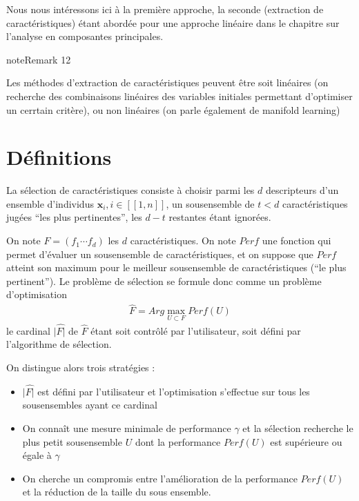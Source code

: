 \documentclass[letterpaper,10pt,english]{jupyterBook}
\begin{document}
\sphinxAtStartPar
Nous nous intéressons ici à la première approche, la seconde (extraction de caractéristiques) étant abordée pour une approche linéaire dans le chapitre sur l’analyse en composantes principales.
\label{selection:remark-0}
\begin{sphinxadmonition}{note}{Remark 12}



\sphinxAtStartPar
Les méthodes d’extraction de caractéristiques peuvent être soit linéaires (on recherche des combinaisons linéaires des variables initiales  permettant d’optimiser un cerrtain critère), ou non linéaires (on parle également de manifold learning)
\end{sphinxadmonition}


\section{Définitions}
\label{\detokenize{selection:definitions}}
\sphinxAtStartPar
La sélection de caractéristiques consiste à choisir parmi les \(d\) descripteurs d’un ensemble d’individus \(\mathbf x_i,i\in[\![1,n]\!]\), un sous\sphinxhyphen{}ensemble de  \(t<d\)  caractéristiques jugées “les plus pertinentes”, les \(d-t\) restantes étant ignorées.

\sphinxAtStartPar
On note \(F = \left (f_1\cdots f_d\right )\) les \(d\) caractéristiques.  On note \(Perf\) une fonction qui permet d’évaluer un sous\sphinxhyphen{}ensemble de caractéristiques, et on suppose que \(Perf\) atteint son maximum pour le meilleur sous\sphinxhyphen{}ensemble de caractéristiques (“le plus pertinent”). Le problème de sélection se formule donc comme un problème d’optimisation
\begin{equation*}
\begin{split}\hat{F} = Arg\displaystyle\max_{U\subset F} Perf(U)\end{split}
\end{equation*}
\sphinxAtStartPar
le cardinal \(|\hat{F|}\) de \(\hat{F}\) étant soit contrôlé par l’utilisateur, soit défini par l’algorithme de sélection.

\sphinxAtStartPar
On distingue alors trois stratégies :
\begin{itemize}
\item {} 
\sphinxAtStartPar
\(|\hat{F|}\) est défini par l’utilisateur et l’optimisation s’effectue sur tous les sous\sphinxhyphen{}ensembles ayant ce cardinal

\item {} 
\sphinxAtStartPar
On connaît une mesure minimale de performance \(\gamma\)  et la sélection recherche le plus petit sous\sphinxhyphen{}ensemble \(U\) dont la performance \(Perf(U)\) est supérieure ou égale à \(\gamma\)

\item {} 
\sphinxAtStartPar
On cherche un compromis entre l’amélioration de la performance \(Perf(U)\) et la réduction de la taille du sous ensemble.

\end{itemize}
\end{document}
